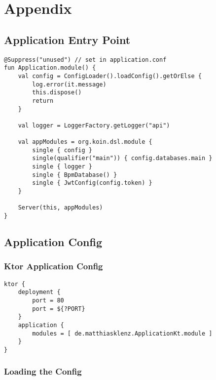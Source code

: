\chapter{Appendix}

\section{Application Entry Point}

\begin{verbatim}
@Suppress("unused") // set in application.conf
fun Application.module() {
    val config = ConfigLoader().loadConfig().getOrElse {
        log.error(it.message)
        this.dispose()
        return
    }

    val logger = LoggerFactory.getLogger("api")

    val appModules = org.koin.dsl.module {
        single { config }
        single(qualifier("main")) { config.databases.main }
        single { logger }
        single { BpmDatabase() }
        single { JwtConfig(config.token) }
    }

    Server(this, appModules)
}
\end{verbatim}

\label{code:app_entry_point}

\section{Application Config}

\subsection{Ktor Application Config}

\begin{verbatim}
ktor {
    deployment {
        port = 80
        port = ${?PORT}
    }
    application {
        modules = [ de.matthiasklenz.ApplicationKt.module ]
    }
}
\end{verbatim}
\label{code:ktor_app_conf}

\subsection{Loading the Config}

